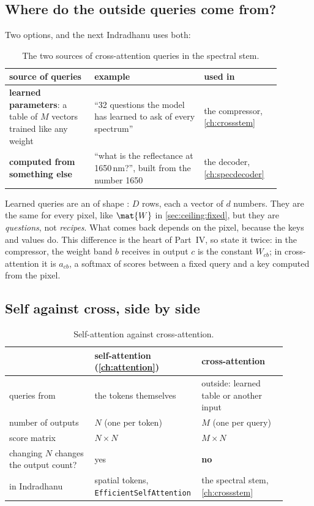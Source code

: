 \subsection{Where do the outside queries come from?}

Two options, and the next Indradhanu uses both:

\begin{table}[htbp]\centering
\caption{The two sources of cross-attention queries in the spectral stem.}\label{tab:ceiling:qsource}
\begin{tabular}{p{0.28\linewidth}p{0.36\linewidth}p{0.24\linewidth}}\toprule
source of queries & example & used in\\\midrule
\textbf{learned parameters}: a table of $M$ vectors trained like any weight & ``32 questions the model has learned to ask of every spectrum'' & the compressor, \cref{ch:crossstem}\\
\textbf{computed from something else} & ``what is the reflectance at 1650\,nm?'', built from the number 1650 & the decoder, \cref{ch:specdecoder}\\\bottomrule
\end{tabular}
\end{table}

Learned queries are an  of shape : $D$ rows, each a vector of $d$ numbers. They are the same for every pixel, like $\mat{W}$ in \cref{sec:ceiling:fixed}, but they are \emph{questions}, not \emph{recipes}. What comes back depends on the pixel, because the keys and values do. This difference is the heart of Part~IV, so state it twice: in the compressor, the weight band $b$ receives in output $c$ is the constant $W_{cb}$; in cross-attention it is $a_{cb}$, a softmax of scores between a fixed query and a key computed from the pixel.

\subsection{Self against cross, side by side}

\begin{table}[htbp]\centering
\caption{Self-attention against cross-attention.}\label{tab:ceiling:selfcross}
\begin{tabular}{p{0.3\linewidth}p{0.3\linewidth}p{0.3\linewidth}}\toprule
 & self-attention (\cref{ch:attention}) & cross-attention\\\midrule
queries from & the tokens themselves & outside: learned table or another input\\
number of outputs & $N$ (one per token) & $M$ (one per query)\\
score matrix & $N\times N$ & $M\times N$\\
changing $N$ changes the output count? & yes & \textbf{no}\\
in Indradhanu & spatial tokens, \texttt{EfficientSelfAttention} & the spectral stem, \cref{ch:crossstem}\\\bottomrule
\end{tabular}
\end{table}

